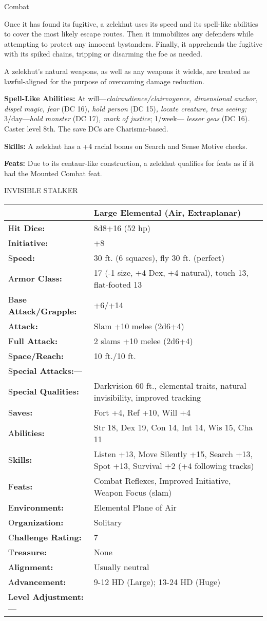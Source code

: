 \documentclass{article}
\begin{document}
Combat

Once it has found its fugitive, a zelekhut uses its speed and its spell-like abilities 
to cover the most likely escape routes. Then it immobilizes any defenders while 
attempting to protect any innocent bystanders. Finally, it apprehends the fugitive 
with its spiked chains, tripping or disarming the foe as needed.

A zelekhut's natural weapons, as well as any weapons it wields, are treated as 
lawful-aligned for the purpose of overcoming damage reduction.

\textbf{Spell-Like Abilities: }At will---\textit{clairaudience/clairvoyance, dimensional 
anchor, dispel magic, fear }(DC 16)\textit{, hold person }(DC 15)\textit{, locate 
creature, true seeing; }3/day---\textit{hold monster }(DC 17)\textit{, mark of 
justice}; 1/week--- \textit{lesser geas }(DC 16)\textit{. }Caster level 8th. The 
save DCs are Charisma-based.

\textbf{Skills: }A zelekhut has a +4 racial bonus on Search and Sense Motive checks.

\textbf{Feats:} Due to its centaur-like construction, a zelekhut qualifies for 
feats as if it had the Mounted Combat feat.

\vspace{12pt}
{\LARGE{}INVISIBLE STALKER}

\begin{tabular}{|>{\raggedright}p{91pt}|>{\raggedright}p{231pt}|}
\hline
  & Large Elemental (Air, Extraplanar)\tabularnewline
\hline
H\textbf{it Dice:} & 8d8+16 (52 hp)\tabularnewline
\hline
I\textbf{nitiative:} & +8\tabularnewline
\hline
S\textbf{peed:} & 30 ft. (6 squares), fly 30 ft. (perfect)\tabularnewline
\hline
A\textbf{rmor Class:} & 17 (-1 size, +4 Dex, +4 natural), touch 13, flat-footed 
13\tabularnewline
\hline
B\textbf{ase Attack/Grapple:} & +6/+14\tabularnewline
\hline
A\textbf{ttack:} & Slam +10 melee (2d6+4)\tabularnewline
\hline
F\textbf{ull Attack:} & 2 slams +10 melee (2d6+4)\tabularnewline
\hline
S\textbf{pace/Reach:} & 10 ft./10 ft.\tabularnewline
\hline
S\textbf{pecial Attacks:}--- & \tabularnewline
\hline
S\textbf{pecial Qualities:} & Darkvision 60 ft., elemental traits, natural invisibility, 
improved tracking\tabularnewline
\hline
S\textbf{aves:} & Fort +4, Ref +10, Will +4\tabularnewline
\hline
A\textbf{bilities:} & Str 18, Dex 19, Con 14, Int 14, Wis 15, Cha 11\tabularnewline
\hline
S\textbf{kills:} & Listen +13, Move Silently +15, Search +13, Spot +13, Survival 
+2 (+4 following tracks)\tabularnewline
\hline
F\textbf{eats:} & Combat Reflexes, Improved Initiative, Weapon Focus (slam)\tabularnewline
\hline
E\textbf{nvironment:} & Elemental Plane of Air\tabularnewline
\hline
O\textbf{rganization:} & Solitary\tabularnewline
\hline
C\textbf{hallenge Rating:} & 7\tabularnewline
\hline
T\textbf{reasure:} & None\tabularnewline
\hline
A\textbf{lignment:} & Usually neutral\tabularnewline
\hline
A\textbf{dvancement:} & 9-12 HD (Large); 13-24 HD (Huge)\tabularnewline
\hline
L\textbf{evel Adjustment:}--- & \tabularnewline
\hline
\end{tabular}
\end{document}
